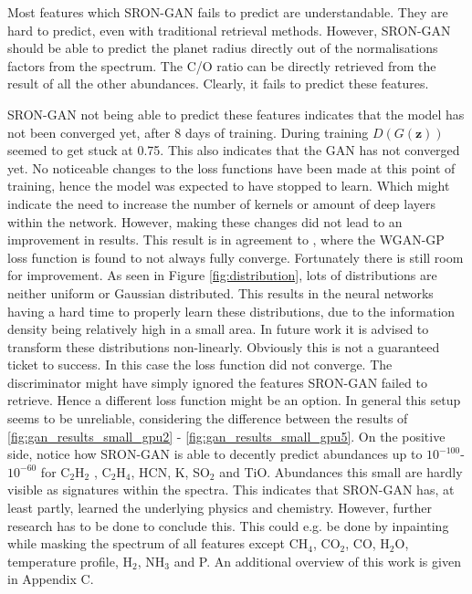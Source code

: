 Most features which SRON-GAN fails to predict are understandable. They are hard to predict, even with traditional retrieval methods. However, SRON-GAN should be able to predict the planet radius directly out of the normalisations factors from the spectrum. The C/O ratio can be directly retrieved from the result of all the other abundances. Clearly, it fails to predict these features.


SRON-GAN not being able to predict these features indicates that the model has not been converged yet, after 8 days of training. During training $D(G(\mathbf{z}))$ seemed to get stuck at 0.75. This also indicates that the GAN has not converged yet. No noticeable changes to the loss functions have been made at this point of training, hence the model was expected to have stopped to learn. Which might indicate the need to increase the number of kernels or amount of deep layers within the network. However, making these changes did not lead to an improvement in results. This result is in agreement to \cite{mescheder2018training}, where the WGAN-GP loss function is found to not always fully converge. Fortunately there is still room for improvement. As seen in Figure \ref{fig:distribution}, lots of distributions are neither uniform or Gaussian distributed. This results in the neural networks having a hard time to properly learn these distributions, due to the information density being relatively high in a small area. In future work it is advised to transform these distributions non-linearly. Obviously this is not a guaranteed ticket to success. In this case the loss function did not converge. The discriminator might have simply ignored the features SRON-GAN failed to retrieve. Hence a different loss function might be an option. In general this setup seems to be unreliable, considering the difference between the results of \ref{fig:gan_results_small_gpu2} - \ref{fig:gan_results_small_gpu5}. On the positive side, notice how SRON-GAN is able to decently predict abundances up to $10^{-100}$-$10^{-60
}$ for C$_2$H$_2$ , C$_2$H$_4$, HCN, K, SO$_2$ and TiO. Abundances this small are hardly visible as signatures within the spectra. This indicates that SRON-GAN has, at least partly, learned the underlying physics and chemistry. However, further research has to be done to conclude this. This could e.g. be done by inpainting while masking the spectrum of all features except CH$_4$, CO$_2$, CO, H$_2$O, temperature profile, H$_2$, NH$_3$ and P. An additional overview of this work is given in Appendix C.

